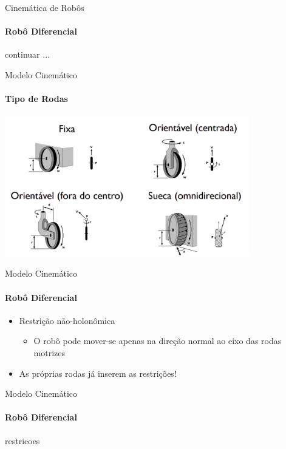 \documentclass{beamer}
\begin{document}
\begin{frame}{Cinemática de Robôs}
    \framesubtitle{Robô Diferencial}

    continuar ...

\end{frame}



\begin{frame}{Modelo Cinemático}
    \framesubtitle{Tipo de Rodas}
    \begin{center}
        \includegraphics[width=0.8\textwidth]{./images/tipo_de_rodas.png}
    \end{center}
\end{frame}

\begin{frame}{Modelo Cinemático}
    \framesubtitle{Robô Diferencial}
    \begin{itemize}
        \item Restrição não-holonômica
              \begin{itemize}
                  \item O robô pode mover-se apenas na direção normal ao eixo das rodas motrizes
              \end{itemize}
        \item As próprias rodas já inserem as restrições!
    \end{itemize}
    \centering
    
\end{frame}


\begin{frame}{Modelo Cinemático}
    \framesubtitle{Robô Diferencial}
    restricoes

\end{frame}
\end{document}
